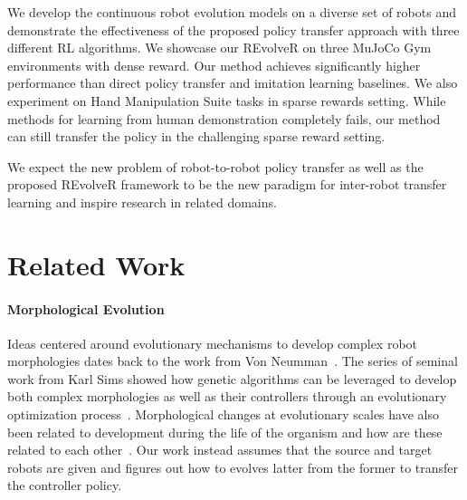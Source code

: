 \documentclass[nohyperref]{article}
\theoremstyle{plain}
\theoremstyle{definition}
\theoremstyle{remark}
\begin{document}
We develop the continuous robot evolution models on a diverse set of robots and demonstrate the effectiveness of the proposed policy transfer approach with three different RL algorithms.
We showcase 
our REvolveR
on three MuJoCo Gym environments \cite{mujoco:gym} with dense reward.
Our method achieves significantly higher performance than direct policy transfer and imitation learning baselines.
We also experiment on Hand Manipulation Suite tasks \cite{dapg} in sparse rewards setting.
While methods for learning from human demonstration completely fails, our method can still transfer the policy in the challenging sparse reward setting. 

We expect the new problem of robot-to-robot policy transfer as well as the proposed REvolveR framework to be the new paradigm for inter-robot transfer learning and inspire research in related domains.



\section{Related Work}

\paragraph{Morphological Evolution}
Ideas centered around evolutionary mechanisms to develop complex robot morphologies dates back to the work from Von Neumman~\cite{von1966theory}. 
The series of seminal work from Karl Sims showed how genetic algorithms can be leveraged to develop both complex morphologies as well as their controllers through an evolutionary optimization process~\cite{sims1994evolving1,sims1994evolving2}. 
Morphological changes at evolutionary scales have also been related to development during the life of the organism and how are these related to each other~\cite{clune2012ontogeny,kriegman2018morphological}. 
Our work instead assumes that the source and target robots are given and 
figures out how to 
evolves latter from the former to transfer the controller policy.
\end{document}

